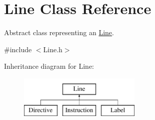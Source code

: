 \hypertarget{classLine}{\section{\-Line \-Class \-Reference}
\label{classLine}
}


\-Abstract class representing an \hyperlink{classLine}{\-Line}.  




{\ttfamily \#include $<$\-Line.\-h$>$}

\-Inheritance diagram for \-Line\-:\begin{figure}[H]
\begin{center}
\leavevmode
\includegraphics[height=2.000000cm]{classLine}
\end{center}
\end{figure}
